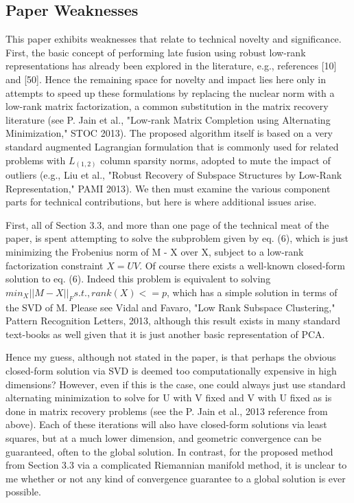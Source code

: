 \documentclass[letterpaper]{article}
\begin{document}
\subsection{Paper Weaknesses}
This paper exhibits weaknesses that relate to technical novelty and significance. 
First, the basic concept of performing late fusion using robust low-rank representations has already been explored in the literature, e.g., references [10] and [50]. Hence the remaining space for novelty and impact lies here only in attempts to speed up these formulations by replacing the nuclear norm with a low-rank matrix factorization, a common substitution in the matrix recovery literature (see P. Jain et al., "Low-rank Matrix Completion using Alternating Minimization," STOC 2013). The proposed algorithm itself is based on a very standard augmented Lagrangian formulation that is commonly used for related problems with $L_{(1,2)}$ column sparsity norms, adopted to mute the impact of outliers (e.g., Liu et al., "Robust Recovery of Subspace Structures by Low-Rank Representation," PAMI 2013). We then must examine the various component parts for technical contributions, but here is where additional issues arise.

First, all of Section 3.3, and more than one page of the technical meat of the paper, is spent attempting to solve the subproblem given by eq. (6), which is just minimizing the Frobenius norm of M - X over X, subject to a low-rank factorization constraint $X = UV$. Of course there exists a well-known closed-form solution to eq. (6). Indeed this problem is equivalent to solving $min_X || M - X ||_F s.t., rank(X) <= p$, which has a simple solution in terms of the SVD of M. Please see Vidal and Favaro, "Low Rank Subspace Clustering," Pattern Recognition Letters, 2013, although this result exists in many standard text-books as well given that it is just another basic representation of PCA.

Hence my guess, although not stated in the paper, is that perhaps the obvious closed-form solution via SVD is deemed too computationally expensive in high dimensions? However, even if this is the case, one could always just use standard alternating minimization to solve for U with V fixed and V with U fixed as is done in matrix recovery problems (see the P. Jain et al., 2013 reference from above). Each of these iterations will also have closed-form solutions via least squares, but at a much lower dimension, and geometric convergence can be guaranteed, often to the global solution. In contrast, for the proposed method from Section 3.3 via a complicated Riemannian manifold method, it is unclear to me whether or not any kind of convergence guarantee to a global solution is ever possible.
\end{document}
